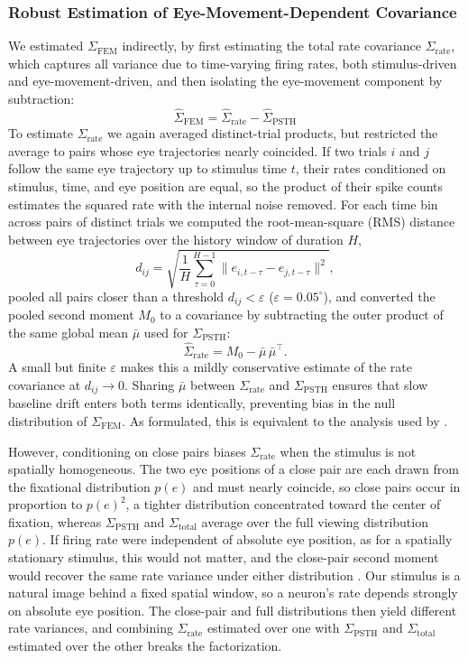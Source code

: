 \documentclass{lite}
\newcommand{\Cpsth}{\Sigma_{\text{PSTH}}}
\newcommand{\Cfem}{\Sigma_{\text{FEM}}}
\newcommand{\Ctotal}{\Sigma_{\text{total}}}
\newcommand{\Crate}{\Sigma_{\text{rate}}}
\begin{document}
\subsubsection{Robust Estimation of Eye-Movement-Dependent Covariance}
We estimated $\Cfem$ indirectly, by first estimating the total rate covariance $\Crate$, which captures all variance due to time-varying firing rates, both stimulus-driven and eye-movement-driven, and then isolating the eye-movement component by subtraction:
\begin{equation}
    \hat{\Sigma}_{\text{FEM}} = \hat{\Sigma}_{\text{rate}} - \hat{\Sigma}_{\text{PSTH}}
\end{equation}
To estimate $\Crate$ we again averaged distinct-trial products, but restricted the average to pairs whose eye trajectories nearly coincided. If two trials $i$ and $j$ follow the same eye trajectory up to stimulus time $t$, their rates conditioned on stimulus, time, and eye position are equal, so the product of their spike counts estimates the squared rate with the internal noise removed. For each time bin across pairs of distinct trials we computed the root-mean-square (RMS) distance between eye trajectories over the history window of duration $H$,
\begin{equation}
    d_{ij} = \sqrt{\frac{1}{H} \sum_{\tau=0}^{H-1} \|e_{i,t-\tau} - e_{j,t-\tau}\|^2},
\end{equation}
pooled all pairs closer than a threshold $d_{ij} < \varepsilon$ ($\varepsilon = 0.05^\circ$), and converted the pooled second moment $M_0$ to a covariance by subtracting the outer product of the same global mean $\bar{\mu}$ used for $\Cpsth$:
\begin{equation}
    \hat{\Sigma}_{\text{rate}} = M_0 - \bar{\mu}\,\bar{\mu}^\top .
\end{equation}
A small but finite $\varepsilon$ makes this a mildly conservative estimate of the rate covariance at $d_{ij} \to 0$. Sharing $\bar{\mu}$ between $\Crate$ and $\Cpsth$ ensures that slow baseline drift enters both terms identically, preventing bias in the null distribution of $\Cfem$. As formulated, this is equivalent to the analysis used by \cite{mcfarland2016variability}.

However, conditioning on close pairs biases $\Crate$ when the stimulus is not spatially homogeneous. The two eye positions of a close pair are each drawn from the fixational distribution $p(e)$ and must nearly coincide, so close pairs occur in proportion to $p(e)^2$, a tighter distribution concentrated toward the center of fixation, whereas $\Cpsth$ and $\Ctotal$ average over the full viewing distribution $p(e)$. If firing rate were independent of absolute eye position, as for a spatially stationary stimulus, this would not matter, and the close-pair second moment would recover the same rate variance under either distribution \cite{mcfarland2016variability}. Our stimulus is a natural image behind a fixed spatial window, so a neuron's rate depends strongly on absolute eye position. The close-pair and full distributions then yield different rate variances, and combining $\Crate$ estimated over one with $\Cpsth$ and $\Ctotal$ estimated over the other breaks the factorization.
\end{document}
